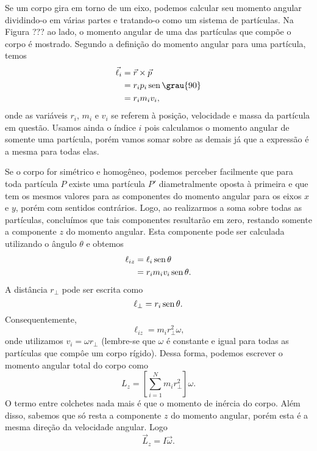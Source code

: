 Se um corpo gira em torno de um eixo, podemos calcular seu momento angular dividindo-o em várias partes e tratando-o como um sistema de partículas. Na Figura ??? ao lado, o momento angular de uma das partículas que compõe o corpo é mostrado. Segundo a definição do momento angular para uma partícula, temos
\begin{align}
  \vec{\ell}_i &= \vec{r}\times\vec{p} \\
  &= r_i p_i \sen \grau{90} \\
  &= r_i m_i v_i,
\end{align}
%
onde as variáveis $r_i$, $m_i$ e $v_i$ se referem à posição, velocidade e massa da partícula em questão. Usamos ainda o índice $i$ pois calculamos o momento angular de somente uma partícula, porém vamos somar sobre as demais já que a expressão é a mesma para todas elas.

Se o corpo for simétrico e homogêneo, podemos perceber facilmente que para toda partícula $P$ existe uma partícula $P'$ diametralmente oposta à primeira e que tem os mesmos valores para as componentes do momento angular para os eixos $x$ e $y$, porém com sentidos contrários. Logo, ao realizarmos a soma sobre todas as partículas, concluímos que tais componentes resultarão em zero, restando somente a componente $z$ do momento angular. Esta componente pode ser calculada utilizando o ângulo $\theta$ e obtemos
\begin{align}
  \ell_{iz} &= \ell_i \operatorname{sen}\theta \\
  &= r_i m_i v_i \operatorname{sen}\theta.
\end{align}
%
A distância $r_{\perp}$ pode ser escrita como
\begin{equation}
  \ell_{\perp} = r_i\operatorname{sen}\theta.
\end{equation}
%
Consequentemente, 
\begin{equation}
  \ell_{iz} = m_i r_{\perp}^2 \omega,
\end{equation}
%
onde utilizamos $v_i = \omega r_{\perp}$ (lembre-se que $\omega$ é constante e igual para todas as partículas que compôe um corpo rígido). Dessa forma, podemos escrever o momento angular total do corpo como
\begin{equation}
  L_z = \left[\sum_{i=1}^N m_i r_{\perp}^2\right] \omega.
\end{equation}
%
O termo entre colchetes nada mais é que o momento de inércia do corpo. Além disso, sabemos que só resta a componente $z$ do momento angular, porém esta é a mesma direção da velocidade angular. Logo
\begin{equation}
  \vec{L}_z = I \vec{\omega}.
\end{equation}

